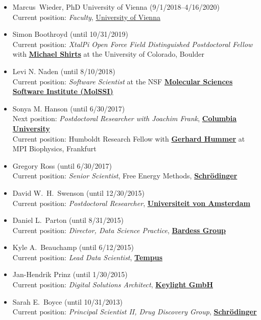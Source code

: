 \documentclass[10pt]{article}
\begin{document}
\begin{itemize}
  \item Marcus~Wieder, PhD University of Vienna (9/1/2018--4/16/2020)\\
  Current position: \emph{Faculty}, \href{https://www.univie.ac.at/en/}{University of Vienna}

  \item Simon Boothroyd (until 10/31/2019)\\
  Current position: \emph{XtalPi Open Force Field Distinguished Postdoctoral Fellow} with \href{https://www.colorado.edu/lab/shirtsgroup/}{{\bf Michael Shirts}} at the University of Colorado, Boulder
  
  \item Levi N. Naden (until 8/10/2018)\\
  Current position: \emph{Software Scientist} at the NSF \href{http://molssi.org}{\bf Molecular Sciences Software Institute (MolSSI)}
  
  \item Sonya M. Hanson (until 6/30/2017)\\
  Next position: \emph{Postdoctoral Researcher with Joachim Frank}, \href{http://franklab.cpmc.columbia.edu/franklab/}{{\bf Columbia University}}\\
  Current position: Humboldt Research Fellow with \href{https://www.biophys.mpg.de/en/hummer.html}{{\bf Gerhard Hummer}} at MPI Biophysics, Frankfurt

  \item Gregory Ross (until 6/30/2017)\\
  Current position: \emph{Senior Scientist}, Free Energy Methods, \href{http://www.schrodinger.com}{{\bf Schr\"{o}dinger}}
  
  \item David W.~H.~Swenson (until 12/30/2015)\\
  Current position: \emph{Postdoctoral Researcher}, \href{http://www.acmm.nl/molsim/users/swenson/index.html}{{\bf Universiteit von Amsterdam}}
  
  \item Daniel L.~Parton (until 8/31/2015)\\
  Current position: \emph{Director, Data Science Practice}, \href{http://www.bardess.com/}{{\bf Bardess Group}}
  
  \item Kyle A.~Beauchamp (until 6/12/2015)\\
  Current position: \emph{Lead Data Scientist}, \href{http://www.tempus.com}{{\bf Tempus}}
  
  \item Jan-Hendrik Prinz (until 1/30/2015)\\
  Current position: \emph{Digital Solutions Architect}, \href{http://www.keylight.de/}{{\bf Keylight GmbH}}
  
  \item Sarah E.~Boyce (until 10/31/2013)\\
  Current position: \emph{Principal Scientist II, Drug Discovery Group},  \href{http://www.schrodinger.com}{{\bf Schr\"{o}dinger}}

\end{itemize}
\end{document}
